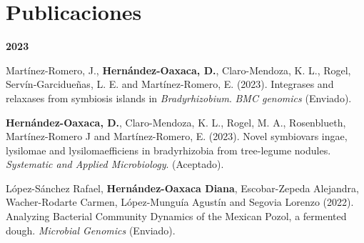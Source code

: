 \documentclass[11pt,a4paper,]{awesome-cv}
\begin{document}
\begin{cventries}
{\begin{cvitems}
\end{cvitems}}
\end{cventries}

\hypertarget{publicaciones}{%
\section{Publicaciones}\label{publicaciones}}

\footnotesize
\setlength{\leftskip}{0cm}

\textbf{2023}

\setlength{\leftskip}{1cm}

Martínez-Romero, J., \textbf{Hernández-Oaxaca, D.}, Claro-Mendoza, K.
L., Rogel, Servín‐Garcidueñas, L. E. and Martínez-Romero, E. (2023).
Integrases and relaxases from symbiosis islands in
\emph{Bradyrhizobium}. \emph{BMC genomics} (Enviado).

\textbf{Hernández-Oaxaca, D.}, Claro-Mendoza, K. L., Rogel, M. A.,
Rosenblueth, Martínez-Romero J and Martínez-Romero, E. (2023). Novel
symbiovars ingae, lysilomae and lysilomaefficiens in bradyrhizobia from
tree-legume nodules. \emph{Systematic and Applied Microbiology}.
(Aceptado).

López-Sánchez Rafael, \textbf{Hernández-Oaxaca Diana}, Escobar-Zepeda
Alejandra, Wacher-Rodarte Carmen, López-Munguía Agustín and Segovia
Lorenzo (2022). Analyzing Bacterial Community Dynamics of the Mexican
Pozol, a fermented dough. \emph{Microbial Genomics} (Enviado).
\end{document}
